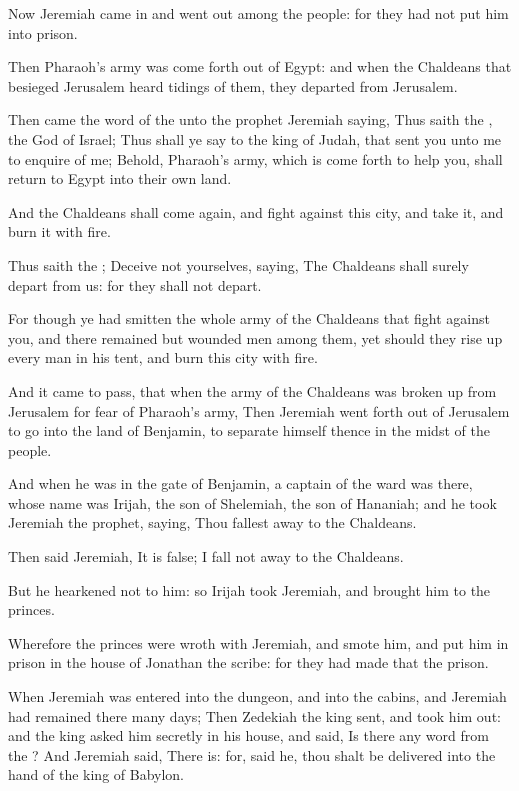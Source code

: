 \Verse Now Jeremiah came in and went out among the people: for they had not put him into prison.

\Verse Then Pharaoh's army was come forth out of Egypt: and when the Chaldeans that besieged Jerusalem heard tidings of them, they departed from Jerusalem.

\Verse Then came the word of the \LORD unto the prophet Jeremiah saying, \Verse Thus saith the \LORD, the God of Israel; Thus shall ye say to the king of Judah, that sent you unto me to enquire of me; Behold, Pharaoh's army, which is come forth to help you, shall return to Egypt into their own land.

\Verse And the Chaldeans shall come again, and fight against this city, and take it, and burn it with fire.

\Verse Thus saith the \LORD; Deceive not yourselves, saying, The Chaldeans shall surely depart from us: for they shall not depart.

\Verse For though ye had smitten the whole army of the Chaldeans that fight against you, and there remained but wounded men among them, yet should they rise up every man in his tent, and burn this city with fire.

\Verse And it came to pass, that when the army of the Chaldeans was broken up from Jerusalem for fear of Pharaoh's army, \Verse Then Jeremiah went forth out of Jerusalem to go into the land of Benjamin, to separate himself thence in the midst of the people.

\Verse And when he was in the gate of Benjamin, a captain of the ward was there, whose name was Irijah, the son of Shelemiah, the son of Hananiah; and he took Jeremiah the prophet, saying, Thou fallest away to the Chaldeans.

\Verse Then said Jeremiah, It is false; I fall not away to the Chaldeans.

But he hearkened not to him: so Irijah took Jeremiah, and brought him to the princes.

\Verse Wherefore the princes were wroth with Jeremiah, and smote him, and put him in prison in the house of Jonathan the scribe: for they had made that the prison.

\Verse When Jeremiah was entered into the dungeon, and into the cabins, and Jeremiah had remained there many days; \Verse Then Zedekiah the king sent, and took him out: and the king asked him secretly in his house, and said, Is there any word from the \LORD? And Jeremiah said, There is: for, said he, thou shalt be delivered into the hand of the king of Babylon.

